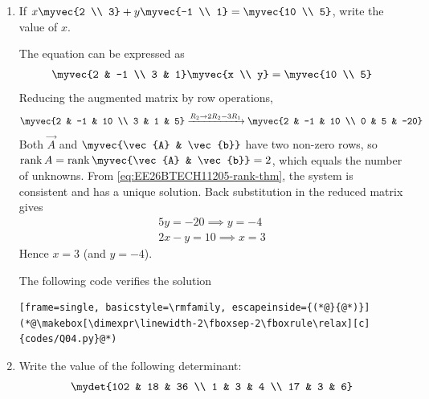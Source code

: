 \begin{enumerate}[label=\thesubsection.\arabic*, ref=\thesubsection.\theenumi, itemsep=3ex]
\medskip
The following code verifies the solution using a random idempotent matrix
\begin{lstlisting}[frame=single, basicstyle=\rmfamily, escapeinside={(*@}{@*)}]
(*@\makebox[\dimexpr\linewidth-2\fboxsep-2\fboxrule\relax][c]{codes/Q03.py}@*)
\end{lstlisting}

\item
If $x\myvec{2 \\ 3} + y\myvec{-1 \\ 1} = \myvec{10 \\ 5}$, write the value of $x$.

\medskip
\solution The equation can be expressed as
\begin{align}
	\myvec{2 & -1 \\ 3 & 1}\myvec{x \\ y} = \myvec{10 \\ 5}
\end{align}
Reducing the augmented matrix by row operations,
\begin{align}
	\myvec{2 & -1 & 10 \\ 3 & 1 & 5} \xrightarrow{R_2 \to 2R_2 - 3R_1} \myvec{2 & -1 & 10 \\ 0 & 5 & -20}
\end{align}
Both $\vec{A}$ and $\myvec{\vec{A} & \vec{b}}$ have two non-zero rows, so $\operatorname{rank}\vec{A} = \operatorname{rank}\myvec{\vec{A} & \vec{b}} = 2$, which equals the number of unknowns. From \eqref{eq:EE26BTECH11205-rank-thm}, the system is consistent and has a unique solution. Back substitution in the reduced matrix gives
\begin{align}
	5y = -20 \implies y = -4
	\\
	2x - y = 10 \implies x = 3
\end{align}
Hence $x = 3$ (and $y = -4$).

\medskip
The following code verifies the solution
\begin{lstlisting}[frame=single, basicstyle=\rmfamily, escapeinside={(*@}{@*)}]
(*@\makebox[\dimexpr\linewidth-2\fboxsep-2\fboxrule\relax][c]{codes/Q04.py}@*)
\end{lstlisting}

\item
Write the value of the following determinant:
\begin{align}
	\mydet{102 & 18 & 36 \\ 1 & 3 & 4 \\ 17 & 3 & 6}
\end{align}


\end{enumerate}
